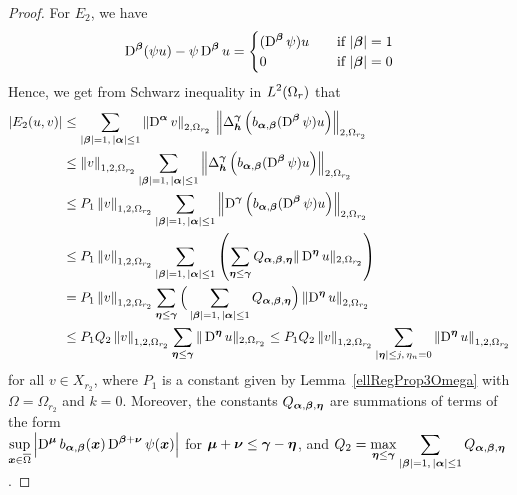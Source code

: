 \begin{proof}
For $E_2$, we have
\[
\operatorname{D}^{{\bm{\beta}}}( \psi u) - \psi \operatorname{D}^{{\bm{\beta}}} u =
\begin{cases}
(\operatorname{D}^{{\bm{\beta}}} \psi ) u  & \quad \text{if} \ |{\bm{\beta}}|=1 \\
0 & \quad \text{if} \ |{\bm{\beta}}| = 0
\end{cases}
\]
Hence, we get from Schwarz inequality in $\displaystyle L^2(\Omega_r)$ that
\begin{align*}
\left| E_2(u,v) \right|
&\leq \sum_{|{\bm{\beta}}|= 1,\,|{\bm{\alpha}}|\leq 1}
\left\| \operatorname{D}^{{\bm{\alpha}}} v\right\|_{2,\Omega_{r_2}} \,
\left\| \Delta_{{\bm{h}}}^{{\bm{\gamma}}} \left( b_{{\bm{\alpha}},{\bm{\beta}}}
(\operatorname{D}^{{\bm{\beta}}} \psi) u \right)\right\|_{2,\Omega_{r_2}} \\
&\leq \left\|v\right\|_{1,2,\Omega_{r_2}}
\sum_{|{\bm{\beta}}|= 1,\,|{\bm{\alpha}}|\leq 1} \left\| 
\Delta_{{\bm{h}}}^{{\bm{\gamma}}} \left( b_{{\bm{\alpha}},{\bm{\beta}}}
(\operatorname{D}^{{\bm{\beta}}} \psi) u \right) \right\|_{2,\Omega_{r_2}} \\
&\leq P_1 \left\|v\right\|_{1,2,\Omega_{r_2}}
\sum_{|{\bm{\beta}}|= 1,\,|{\bm{\alpha}}|\leq 1} \left\| 
\operatorname{D}^{{\bm{\gamma}}} \left( b_{{\bm{\alpha}},{\bm{\beta}}}
(\operatorname{D}^{{\bm{\beta}}} \psi) u \right) \right\|_{2,\Omega_{r_2}} \\
&\leq P_1 \left\|v\right\|_{1,2,\Omega_{r_2}}
\sum_{|{\bm{\beta}}|=1,\,|{\bm{\alpha}}|\leq 1} \left(
\sum_{{\bm{\eta}} \leq {\bm{\gamma}}} Q_{{\bm{\alpha}},{\bm{\beta}},{\bm{\eta}}}
\| \operatorname{D}^{{\bm{\eta}}} u \|_{2,\Omega_{r_2}} \right) \\
&= P_1 \left\|v\right\|_{1,2,\Omega_{r_2}}
\sum_{{\bm{\eta}} \leq {\bm{\gamma}}} \Big(
\sum_{|{\bm{\beta}}|=1,\,|{\bm{\alpha}}|\leq 1}
Q_{{\bm{\alpha}},{\bm{\beta}},{\bm{\eta}}} \Big)
\left\| \operatorname{D}^{{\bm{\eta}}} u \right\|_{2,\Omega_{r_2}} \\
&\leq P_1 Q_2 \left\|v\right\|_{1,2,\Omega_{r_2}}
\sum_{{\bm{\eta}} \leq {\bm{\gamma}}}
\| \operatorname{D}^{{\bm{\eta}}} u \|_{2,\Omega_{r_2}}
\leq P_1 Q_2 \left\|v\right\|_{1,2,\Omega_{r_2}}
\sum_{|{\bm{\eta}}|\leq j,\,\eta_n=0}
\left\| \operatorname{D}^{{\bm{\eta}}} u \right\|_{1,2,\Omega_{r_2}}
\end{align*}
for all $v \in X_{r_2}$, where $P_1$ is a constant given by
Lemma~\ref{ellRegProp3Omega} with $\Omega = \Omega_{r_2}$ and $k=0$.
Moreover, the constants $Q_{{\bm{\alpha}},{\bm{\beta}},{\bm{\eta}}}$ are
summations of terms of the form \\
$\displaystyle \sup_{{\bm{x}} \in \overline{\Omega}} \left|\operatorname{D}^{{\bm{\mu}}}
b_{{\bm{\alpha}},{\bm{\beta}}}({\bm{x}})\operatorname{D}^{{\bm{\beta}}+{\bm{\nu}}}
\psi({\bm{x}}) \right|$
for ${\bm{\mu}}+{\bm{\nu}} \leq {\bm{\gamma}} - {\bm{\eta}}$, and
$\displaystyle Q_2 = \max_{{\bm{\eta}} \leq {\bm{\gamma}}}
\sum_{|{\bm{\beta}}|=1,\,|{\bm{\alpha}}|\leq 1}
Q_{{\bm{\alpha}},{\bm{\beta}},{\bm{\eta}}}$.


\end{proof}
